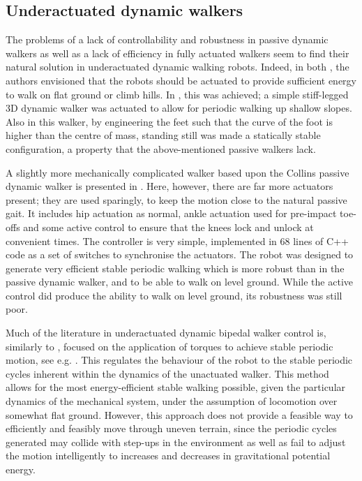 \subsection{Underactuated dynamic walkers}
The problems of a lack of controllability and robustness in passive dynamic walkers as well as a lack of efficiency in fully actuated walkers seem to find their natural solution in underactuated dynamic  walking robots. Indeed, in both \cite{mcgeer1990passive, collins2001three}, the authors envisioned that the robots should be actuated to provide sufficient energy to walk on flat ground or climb hills. In \cite{tedrake2004actuating}, this was achieved; a simple stiff-legged 3D dynamic walker was actuated to allow for periodic walking up shallow slopes. Also in this walker, by engineering the feet such that the curve of the foot is higher than the centre of mass, standing still was made a statically stable configuration, a property that the above-mentioned passive walkers lack.

A slightly more mechanically complicated walker based upon the Collins passive dynamic walker is presented in \cite{collins2005bipedal}. Here, however, there are far more actuators present; they are used sparingly, to keep the motion close to the natural passive gait. It includes hip actuation as normal, ankle actuation used for pre-impact toe-offs and some active control to ensure that the knees lock and unlock at convenient times. The controller is very simple, implemented in 68 lines of C++ code as a set of switches to synchronise the actuators. The robot was designed to generate very efficient stable periodic walking which is more robust than in the passive dynamic walker, and to be able to walk on level ground. While the active control did produce the ability to walk on level ground, its robustness was still poor.

Much of the literature in underactuated dynamic bipedal walker control is, similarly to \cite{tedrake2004actuating, collins2005bipedal}, focused on the application of torques to achieve stable periodic motion, see e.g. \cite{grizzle2001asymptotically, shiriaev2005constructive, sreenath2011compliant}. This regulates the behaviour of the robot to the stable periodic cycles inherent within the dynamics of the unactuated walker. This method allows for the most energy-efficient stable walking possible, given the particular dynamics of the mechanical system, under the assumption of locomotion over somewhat flat ground. However, this approach does not provide a feasible way to efficiently and feasibly move through uneven terrain, since the periodic cycles generated may collide with step-ups in the environment as well as fail to adjust the motion intelligently to increases and decreases in gravitational potential energy.

